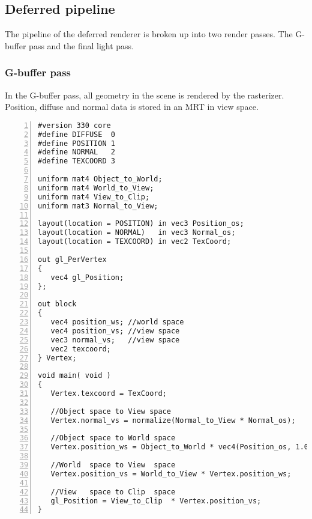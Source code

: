 \subsection{Deferred pipeline}
The pipeline of the deferred renderer is broken up into two render passes. The G-buffer pass and the final light pass.

\subsubsection{G-buffer pass}
In the G-buffer pass, all geometry in the scene is rendered by the rasterizer. Position, diffuse and normal data is stored in an MRT in view space.

\begin{Verbatim}[frame=single, numbers=left, label=G-buffer vertex shader]
#version 330 core
#define DIFFUSE  0
#define POSITION 1
#define NORMAL   2
#define TEXCOORD 3

uniform mat4 Object_to_World;
uniform mat4 World_to_View;
uniform mat4 View_to_Clip;
uniform mat3 Normal_to_View;

layout(location = POSITION) in vec3 Position_os;
layout(location = NORMAL)   in vec3 Normal_os;
layout(location = TEXCOORD) in vec2 TexCoord;

out gl_PerVertex
{
   vec4 gl_Position;
};

out block
{
   vec4 position_ws; //world space
   vec4 position_vs; //view space
   vec3 normal_vs;   //view space
   vec2 texcoord;
} Vertex;

void main( void )
{	
   Vertex.texcoord = TexCoord;
	
   //Object space to View space
   Vertex.normal_vs = normalize(Normal_to_View * Normal_os);
	
   //Object space to World space
   Vertex.position_ws = Object_to_World * vec4(Position_os, 1.0);
	
   //World  space to View  space
   Vertex.position_vs = World_to_View * Vertex.position_ws;
	
   //View   space to Clip  space
   gl_Position = View_to_Clip  * Vertex.position_vs;
}
\end{Verbatim}

